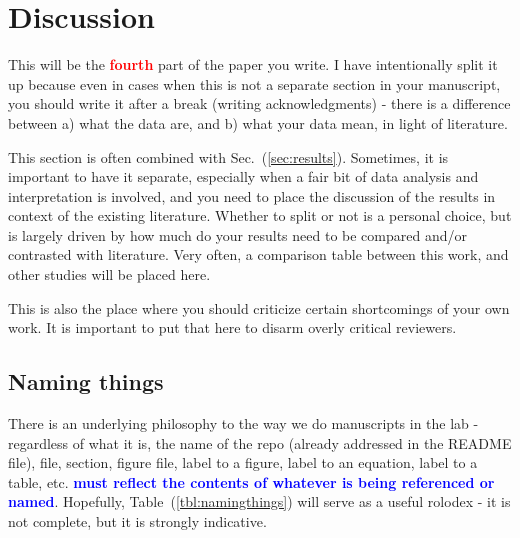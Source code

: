 \documentclass[12 pt]{article}
\begin{document}
\section{Discussion}
\label{sec:discussion}

This will be the \textbf{\Huge \textcolor{red}{fourth}} part of the paper you write. I have intentionally split it up because even in cases when this is not a separate section in your manuscript, you should write it after a break (writing acknowledgments) - there is a difference between a) what the data are, and b) what your data mean, in light of literature.

This section is often combined with Sec.~(\ref{sec:results}). Sometimes, it is important to have it separate, especially when a fair bit of data analysis and interpretation is involved, and you need to place the discussion of the results in context of the existing literature. Whether to split or not is a personal choice, but is largely driven by how much do your results need to be compared and/or contrasted with literature. Very often, a comparison table between this work, and other studies will be placed here.

This is also the place where you should criticize certain shortcomings of your own work. It is important to put that here to disarm overly critical reviewers.


\subsection{Naming things}

There is an underlying philosophy to the way we do manuscripts in the lab - regardless of what it is, the name of the repo (already addressed in the README file), file, section, figure file, label to a figure, label to an equation, label to a table, etc. \textbf{\Huge \textcolor{blue}{must reflect the contents of whatever is being referenced or named}}. Hopefully, Table~(\ref{tbl:namingthings}) will serve as a useful rolodex - it is not complete, but it is strongly indicative.
\end{document}
